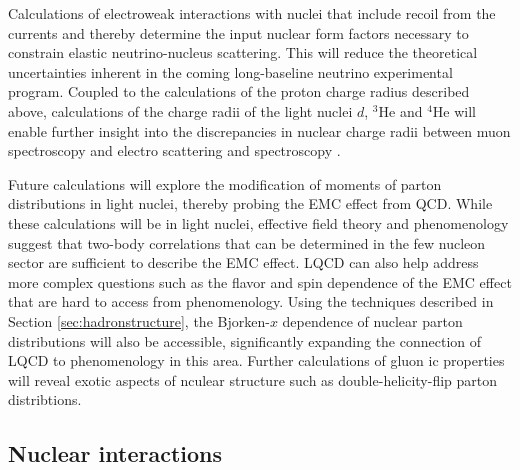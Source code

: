 Calculations of electroweak interactions with nuclei that include recoil from the currents and thereby determine the input nuclear form factors necessary to constrain  elastic  neutrino-nucleus scattering. This will reduce the theoretical uncertainties inherent in the coming long-baseline neutrino experimental program. Coupled to the calculations of the proton charge radius described above, calculations of the charge radii of the light nuclei $d$, $^3$He and $^4$He  will enable further insight into the discrepancies in nuclear charge radii between muon spectroscopy and electro scattering and spectroscopy \cite{}.


Future calculations will explore the modification of moments of parton distributions in light nuclei, thereby probing the EMC effect from QCD. While these calculations will be in light nuclei, effective field theory \cite{Chen:2004zx,Chen:2016bde} and phenomenology \cite{Hen:2016kwk} suggest that two-body correlations that can be determined in the few nucleon sector are sufficient to describe the EMC effect. LQCD can also help address more complex questions such as the flavor and spin dependence of the EMC effect that are hard to access from phenomenology. Using the techniques described in Section \ref{sec:hadronstructure}, the Bjorken-$x$ dependence of nuclear parton distributions will also be accessible, significantly expanding the connection of LQCD to phenomenology in this area. Further calculations of gluon ic properties will reveal exotic aspects of nculear structure such as double-helicity-flip parton distribtions.






\subsection{Nuclear interactions}



